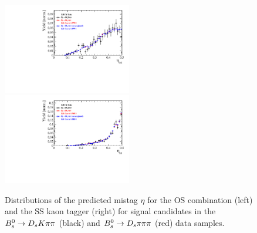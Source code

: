 % 

\begin{figure}[h]
\includegraphics[height=!,width=0.5\textwidth]{figs/dataVsMC/norm2signal/Ds2all_Bs_TAGOMEGA_OS.pdf}
\includegraphics[height=!,width=0.5\textwidth]{figs/dataVsMC/norm2signal/Ds2all_Bs_SS_nnetKaon_PROB.pdf}
\caption{Distributions of the predicted mistag $\eta$ for the OS combination (left) and the SS kaon tagger (right) 
for signal candidates in the ${{B}^0_{s}}\rightarrow{\ensuremath{{D}_{s}}}{\ensuremath{K}}{\ensuremath{\pi}}{\ensuremath{\pi}}$ (black) and ${{B}^0_{s}}\rightarrow{\ensuremath{{D}_{s}}}{\ensuremath{\pi}}{\ensuremath{\pi}}{\ensuremath{\pi}}$ (red) data samples.}
\label{fig:w_data_comparison}
\end{figure}

